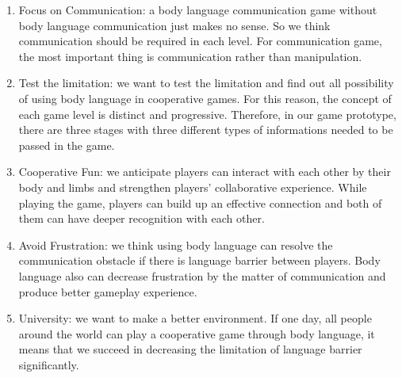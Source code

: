 \documentclass{sigchi}
\begin{document}
\begin{enumerate}
\item Focus on Communication: a body language communication game without body language communication just makes no sense. So we think communication should be required in each level. For communication game, the most important thing is communication rather than manipulation.

\item Test the limitation: we want to test the limitation and find out all possibility of using body language in cooperative games.
For this reason, the concept of each game level is distinct and progressive.
Therefore, in our game prototype, there are three stages with three different types of informations needed to be passed in the game. 

\item Cooperative Fun: 
we anticipate players can interact with each other by their body and limbs and strengthen players' collaborative experience. While playing the game, players can build up an effective connection and both of them can have deeper recognition with each other.

\item Avoid Frustration: 
we think using body language can resolve the communication obstacle if there is language barrier between players. Body language also can decrease frustration by the matter of communication and produce better gameplay experience.

\item University: we want to make a better environment. If one day, all people around the world can play a cooperative game through body language, it means that we succeed in decreasing the limitation of language barrier significantly.
\end{enumerate}
\end{document}
